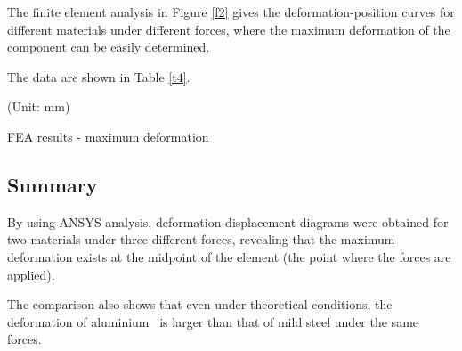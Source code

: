 The finite element analysis in Figure \ref{f2} gives the deformation-position 
curves for different materials under different forces, 
where the maximum deformation of the component can be easily determined.

The data are shown in Table \ref{t4}.

\begin{minipage}[htbp]{\textwidth}
    \makeatletter{}
    \centering
    
    (Unit: mm)
    \caption{FEA results - maximum deformation}
    \label{t4} 
\end{minipage}



\subsection*{Summary}
By using ANSYS analysis, deformation-displacement diagrams were obtained 
for two materials under three different forces, revealing that the maximum 
deformation exists at the midpoint of the element (the point where the forces are applied).

The comparison also shows that even under theoretical conditions, the deformation of aluminium \
is larger than that of mild steel under the same forces.